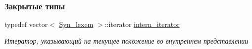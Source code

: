 \subsubsection*{Закрытые типы}
\begin{DoxyCompactItemize}
\item 
\hypertarget{class_mygrep_ab095dfb9624dcc11dc8b51399d15f429}{}typedef vector$<$ \hyperlink{class_syn__lexem}{Syn\+\_\+lexem} $>$\+::iterator \hyperlink{class_mygrep_ab095dfb9624dcc11dc8b51399d15f429}{intern\+\_\+iterator}\label{class_mygrep_ab095dfb9624dcc11dc8b51399d15f429}

\begin{DoxyCompactList}\small\item\em Итератор, указывающий на текущее положение во внутреннем представлении \end{DoxyCompactList}\end{DoxyCompactItemize}

